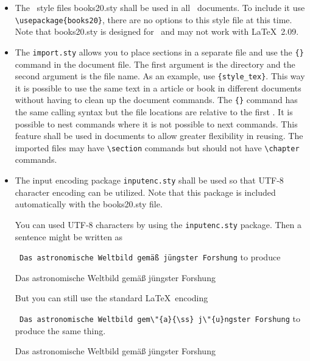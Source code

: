 \begin{itemize}
  
\item The \LaTeXe\ style files books20.sty shall be used in all
  \LaTeXe\ documents. To include it use \verb|\usepackage{books20}|, there
  are no options to this style file at this time. Note that books20.sty
  is designed for \LaTeXe\ and may not work with \LaTeX\ 2.09.
  

\item The \texttt{import.sty} allows you to place sections in a
  separate file and use the \verb|{}| command in the document
  file. The first argument is the directory and the second argument is
  the file name. As an example, use \verb|{style_tex}|.
  This way it is possible to use the same text in a article or book in
  different documents without having to clean up the document
  commands. The \verb|{}| command has the same calling
  syntax but the file locations are relative to the first
  \verb||. It is possible to nest \verb|| commands where
  it is not possible to next \verb|| commands. This feature
  shall be used in documents to allow greater flexibility in
  reusing. The imported files may have \verb|\section| commands but
  should not have \verb|\chapter| commands.

\item {The input encoding package \texttt{inputenc.sty} shall be used
  so that UTF-8 character encoding can be utilized. Note that this
  package is included automatically with the books20.sty file.

  You can used UTF-8 characters by using the \texttt{inputenc.sty}
  package.  Then a sentence might be written as
  
  \verb| Das astronomische Weltbild gemäß jüngster Forshung|
  to produce

  Das astronomische Weltbild gemäß jüngster Forshung

  But you can still use the standard \LaTeX\ encoding
  
  \verb| Das astronomische Weltbild gem\"{a}{\ss} j\"{u}ngster Forshung|
  to produce the same thing.

  Das astronomische Weltbild gem\"{a}{\ss} j\"{u}ngster Forshung

}
\end{itemize}
